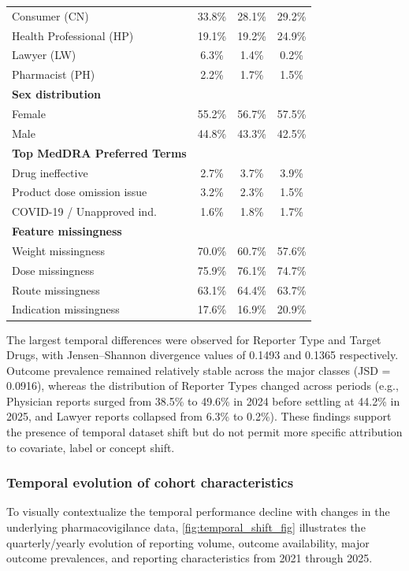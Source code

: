 \documentclass[10pt]{article}
\begin{document}
\begin{table}[htbp]
\begin{tabularx}{\textwidth}{|>{\raggedright\arraybackslash}X|c|c|c|}
\quad Consumer (CN) & 33.8\% & 28.1\% & 29.2\% \\
\quad Health Professional (HP) & 19.1\% & 19.2\% & 24.9\% \\
\quad Lawyer (LW) & 6.3\% & 1.4\% & 0.2\% \\
\quad Pharmacist (PH) & 2.2\% & 1.7\% & 1.5\% \\
\hline
\textbf{Sex distribution} & & & \\
\quad Female & 55.2\% & 56.7\% & 57.5\% \\
\quad Male & 44.8\% & 43.3\% & 42.5\% \\
\hline
\textbf{Top MedDRA Preferred Terms} & & & \\
\quad Drug ineffective & 2.7\% & 3.7\% & 3.9\% \\
\quad Product dose omission issue & 3.2\% & 2.3\% & 1.5\% \\
\quad COVID-19 / Unapproved ind. & 1.6\% & 1.8\% & 1.7\% \\
\hline
\textbf{Feature missingness} & & & \\
\quad Weight missingness & 70.0\% & 60.7\% & 57.6\% \\
\quad Dose missingness & 75.9\% & 76.1\% & 74.7\% \\
\quad Route missingness & 63.1\% & 64.4\% & 63.7\% \\
\quad Indication missingness & 17.6\% & 16.9\% & 20.9\% \\
\hline
\end{tabularx}
\end{table}

The largest temporal differences were observed for Reporter Type and Target Drugs, with Jensen--Shannon divergence values of 0.1493 and 0.1365 respectively. Outcome prevalence remained relatively stable across the major classes (JSD = 0.0916), whereas the distribution of Reporter Types changed across periods (e.g., Physician reports surged from 38.5\% to 49.6\% in 2024 before settling at 44.2\% in 2025, and Lawyer reports collapsed from 6.3\% to 0.2\%). These findings support the presence of temporal dataset shift but do not permit more specific attribution to covariate, label or concept shift.


\subsubsection{Temporal evolution of cohort characteristics}
To visually contextualize the temporal performance decline with changes in the underlying pharmacovigilance data, \cref{fig:temporal_shift_fig} illustrates the quarterly/yearly evolution of reporting volume, outcome availability, major outcome prevalences, and reporting characteristics from 2021 through 2025.
\end{document}
